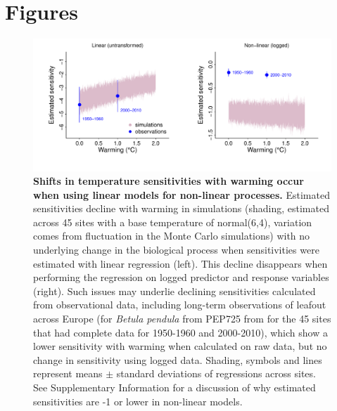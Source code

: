 \documentclass[11pt,letter]{article}
\begin{document}
\newpage
\section* {Figures}

\begin{figure}[h!]
\centering
\noindent \includegraphics[width=1.05\textwidth]{..//analyses/figures/basicsimsandpepalt1.pdf} %
\caption{\textbf{Shifts in temperature sensitivities with warming occur when using linear models for non-linear processes.} Estimated sensitivities decline with warming in simulations (shading, estimated across 45 sites with a base temperature of normal(6,4), variation comes from fluctuation in the Monte Carlo simulations) with no underlying change in the biological process when sensitivities were estimated with linear regression (left). This decline disappears when performing the regression on logged predictor and response variables (right). Such issues may underlie declining sensitivities calculated from observational data, including long-term observations of leafout across Europe (for \emph{Betula pendula} from PEP725 from for the 45 sites that had complete data for 1950-1960 and 2000-2010), which show a lower sensitivity with warming when calculated on raw data, but no change in sensitivity using logged data. Shading, symbols and lines represent means $\pm$ standard deviations of regressions across sites. See Supplementary Information for a discussion of why estimated sensitivities are -1 or lower in non-linear models.} %
\label{fig:basicsimswpep} %
\end{figure}
\end{document}
